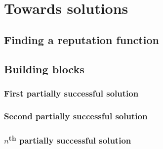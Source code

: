 \chapter{Towards solutions}
\section{Finding a reputation function}

\section{Building blocks}
\subsection{First partially successful solution}
\subsection{Second partially successful solution}
\subsection{$n$\textsuperscript{th} partially successful solution}